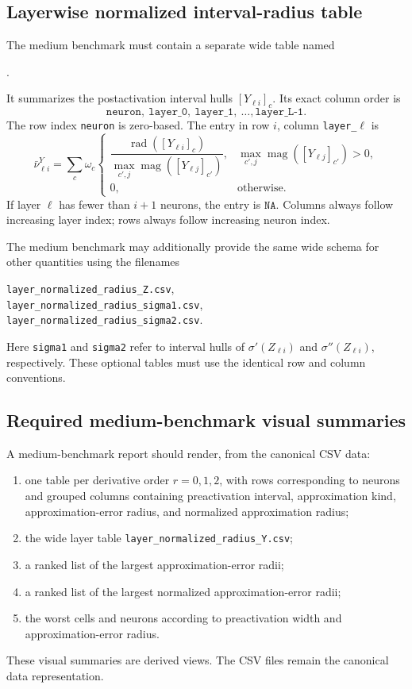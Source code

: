 \documentclass[11pt]{article}
\newcommand{\rad}{\operatorname{rad}}
\newcommand{\magI}{\operatorname{mag}}
\newcommand{\NA}{\texttt{NA}}
\begin{document}
\subsection{Layerwise normalized interval-radius table}

The medium benchmark must contain a separate wide table named
\begin{center}.\end{center}
It summarizes the postactivation
interval hulls \([Y_{\ell i}]_c\).  Its exact column order is
\[
 \texttt{neuron},\ \texttt{layer\_0},\ \texttt{layer\_1},\ \ldots,
 \texttt{layer\_{L-1}}.
\]
The row index \texttt{neuron} is zero-based.  The entry in row \(i\), column
\texttt{layer\_\(\ell\)} is
\[
 \bar\nu_{\ell i}^{Y}
 =\sum_c\omega_c
 \begin{cases}
 \dfrac{\rad([Y_{\ell i}]_c)}
 {\max_{c',j}\magI([Y_{\ell j}]_{c'})},
 &\max_{c',j}\magI([Y_{\ell j}]_{c'})>0,\\[3mm]
 0,&\text{otherwise}.
 \end{cases}
\]
If layer \(\ell\) has fewer than \(i+1\) neurons, the entry is \(\NA\).
Columns always follow increasing layer index; rows always follow increasing
neuron index.

The medium benchmark may additionally provide the same wide schema for other
quantities using the filenames
\begin{center}
\texttt{layer\_normalized\_radius\_Z.csv},\\
\texttt{layer\_normalized\_radius\_sigma1.csv},\\
\texttt{layer\_normalized\_radius\_sigma2.csv}.
\end{center}
Here \texttt{sigma1} and \texttt{sigma2} refer to interval hulls of
\(\sigma'(Z_{\ell i})\) and \(\sigma''(Z_{\ell i})\), respectively.  These
optional tables must use the identical row and column conventions.

\subsection{Required medium-benchmark visual summaries}

A medium-benchmark report should render, from the canonical CSV data:
\begin{enumerate}[label=\arabic*.]
 \item one table per derivative order \(r=0,1,2\), with rows corresponding to
 neurons and grouped columns containing preactivation interval, approximation
 kind, approximation-error radius, and normalized approximation radius;
 \item the wide layer table \texttt{layer\_normalized\_radius\_Y.csv};
 \item a ranked list of the largest approximation-error radii;
 \item a ranked list of the largest normalized approximation-error radii;
 \item the worst cells and neurons according to preactivation width and
 approximation-error radius.
\end{enumerate}
These visual summaries are derived views.  The CSV files remain the canonical
data representation.
\end{document}
